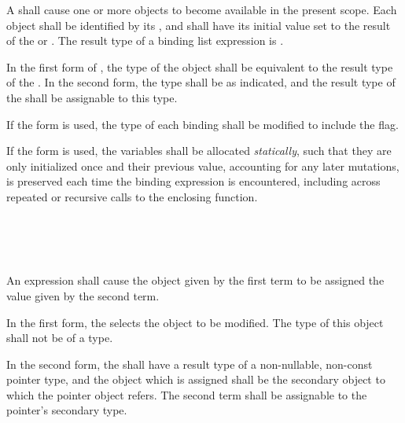 \specsubsubitem
A  shall cause one or more objects to become
available in the present scope. Each object shall be identified by its
, and shall have its initial value set to the result of the
 or . The result
type of a binding list expression is .

\specsubsubitem
In the first form of , the type of the object shall
be equivalent to the result type of the . In the
second form, the type shall be as indicated, and the result type of the
 shall be assignable to this type.

\specsubsubitem
If the  form is used, the type of each binding shall be
modified to include the  flag.

\specsubsubitem
If the  form is used, the variables shall be allocated
\textit{statically}, such that they are only initialized once and their
previous value, accounting for any later mutations, is preserved each time
the binding expression is encountered, including across repeated or recursive
calls to the enclosing function.


\begin{grammar}
 \\
	 \terminal{=}  \\
	\terminal{*}  \terminal{=}  \\
\end{grammar}

\specsubsubitem
An  expression shall cause the object given by the
first term to be assigned the value given by the second term.

\specsubsubitem
In the first form, the  selects the object to be
modified. The type of this object shall not be of a  type.

\specsubsubitem
In the second form, the  shall have a result type
of a non-nullable, non-const pointer type, and the object which is assigned
shall be the secondary object to which the pointer object refers. The second
term shall be assignable to the pointer's secondary type.

